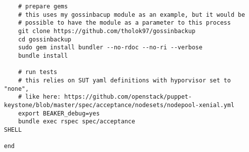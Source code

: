 \begin{verbatim}
    # prepare gems
    # this uses my gossinbacup module as an example, but it would be
    # possible to have the module as a parameter to this process
    git clone https://github.com/tholok97/gossinbackup
    cd gossinbackup
    sudo gem install bundler --no-rdoc --no-ri --verbose
    bundle install

    # run tests
    # this relies on SUT yaml definitions with hyporvisor set to "none",
    # like here: https://github.com/openstack/puppet-keystone/blob/master/spec/acceptance/nodesets/nodepool-xenial.yml
    export BEAKER_debug=yes
    bundle exec rspec spec/acceptance
SHELL

end
\end{verbatim}


